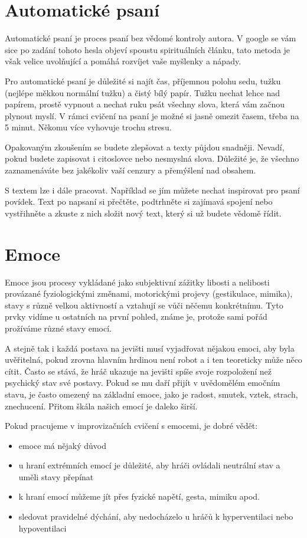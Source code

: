\needspace{5cm} \section{Automatické psaní} \label{automatické psaní} Automatické psaní je proces psaní bez vědomé kontroly autora. V google se vám sice po zadání tohoto hesla objeví spoustu spirituálních článku, tato metoda je však velice uvolňující a pomáhá rozvíjet vaše myšlenky a nápady. 
 
Pro automatické psaní je důležité si najít čas, příjemnou polohu sedu, tužku (nejlépe měkkou normální tužku) a čistý bílý papír.  
Tužku nechat lehce nad papírem, prostě vypnout a nechat ruku psát všechny slova, která vám začnou plynout myslí. 
V rámci cvičení na psaní je možné si jasně omezit časem, třeba na 5 minut. Někomu více vyhovuje trochu stresu. 
 
Opakovaným zkoušením se budete zlepšovat a texty půjdou snadněji. 
Nevadí, pokud budete zapisovat i citoslovce nebo nesmyslná slova. Důležité je, že všechno zaznamenáváte bez jakékoliv vaší cenzury a přemýšlení nad obsahem. 
 
S textem lze i dále pracovat. Například se jím můžete nechat inspirovat pro psaní povídek. 
Text po napsaní si přečtěte, podtrhněte si zajímavá spojení nebo vystřihněte a zkuste z nich složit nový text, který si už budete vědomě řídit. 
\needspace{5cm} \section{Emoce} \label{emoce} Emoce jsou procesy vykládané jako subjektivní zážitky libosti a nelibosti provázané fyziologickými změnami, motorickými projevy (gestikulace, mimika), stavy s různě velkou aktivností a vztahují se vůči něčemu konkrétnímu. Tyto prvky vidíme u ostatních na první pohled, známe je, protože sami pořád prožíváme různé stavy emocí. 
 
A stejně tak i každá postava na jevišti musí vyjadřovat nějakou emoci, aby byla uvěřitelná, pokud zrovna hlavním hrdinou není robot a i ten teoreticky může něco cítit. Často se stává, že hráč ukazuje na jevišti spíše svoje rozpoložení než psychický stav své postavy. Pokud se mu daří přijít v uvědomělém emočním stavu, je často omezený na základní emoce, jako je radost, smutek, vztek, strach, znechucení. Přitom škála našich emocí je daleko širší. 
 
Pokud pracujeme v improvizačních cvičení s emocemi, je dobré vědět: 
\begin{itemize}
\item  emoce má nějaký důvod
\item  u hraní extrémních emocí je důležité, aby hráči ovládali neutrální stav a uměli stavy přepínat
\item  k hraní emocí můžeme jít přes fyzické napětí, gesta, mimiku apod.
\item  sledovat pravidelné dýchání, aby nedocházelo u hráčů k hyperventilaci nebo hypoventilaci
\end{itemize}
 
